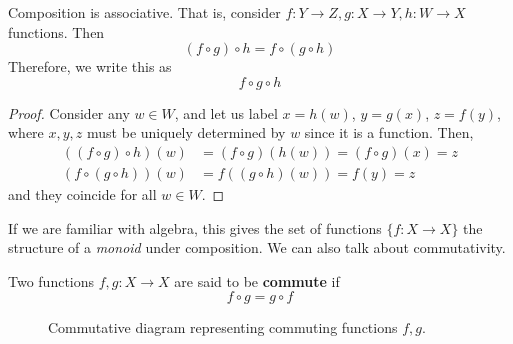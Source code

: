   \begin{theorem}[Associativity]
    Composition is associative. That is, consider $f: Y \rightarrow Z, g: X \rightarrow Y, h: W \rightarrow X$ functions. Then 
    \begin{equation}
      (f \circ g) \circ h = f \circ (g \circ h)
    \end{equation} 
    Therefore, we write this as 
    \begin{equation}
      f \circ g \circ h
    \end{equation} 
    \begin{figure}[H]
      \centering 
      \caption{} 
      \label{fig:associative}
    \end{figure}
  \end{theorem}
  \begin{proof}
    Consider any $w \in W$, and let us label $x = h(w)$, $y = g(x)$, $z = f(y)$, where $x, y, z$ must be uniquely determined by $w$ since it is a function. Then, 
    \begin{align}
      ((f \circ g) \circ h) (w) & = (f \circ g) (h(w)) = (f \circ g) (x) = z  \\
      (f \circ (g \circ h)) (w) & = f ((g \circ h)(w)) = f (y) = z
    \end{align}
    and they coincide for all $w \in W$. 
  \end{proof} 

  If we are familiar with algebra, this gives the set of functions $\{f: X \rightarrow X\}$ the structure of a \textit{monoid} under composition. We can also talk about commutativity. 

  \begin{definition}[Commutativity]
    Two functions $f, g: X \rightarrow X$ are said to be \textbf{commute} if 
    \begin{equation}
      f \circ g = g \circ f
    \end{equation} 
    \begin{figure}[H]
      \centering 
      \caption{Commutative diagram representing commuting functions $f, g$. } 
      \label{fig:commutative}
    \end{figure}
  \end{definition}

